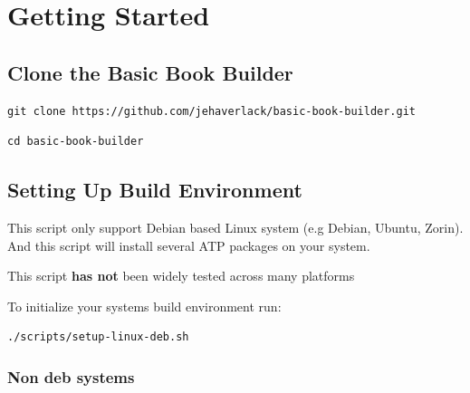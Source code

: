 \documentclass[
  12pt,
  openany]{book}
\begin{document}
\chapter{Getting Started}\label{getting-started}

\section{Clone the Basic Book
Builder}\label{clone-the-basic-book-builder}

\begin{clibox}
\begin{verbatim}
git clone https://github.com/jehaverlack/basic-book-builder.git
\end{verbatim}

\end{clibox}

\begin{clibox}
\begin{verbatim}
cd basic-book-builder
\end{verbatim}

\end{clibox}

\section{Setting Up Build
Environment}\label{setting-up-build-environment}

\begin{cautionbox}
This script only support Debian based Linux system (e.g Debian, Ubuntu,
Zorin). And this script will install several ATP packages on your
system.
\end{cautionbox}

\begin{dangerbox}[Warning]
This script \textbf{has not} been widely tested across many platforms
\end{dangerbox}

To initialize your systems build environment run:

\begin{clibox}
\begin{verbatim}
./scripts/setup-linux-deb.sh
\end{verbatim}

\end{clibox}

\subsection{Non deb systems}\label{non-deb-systems}
\end{document}
